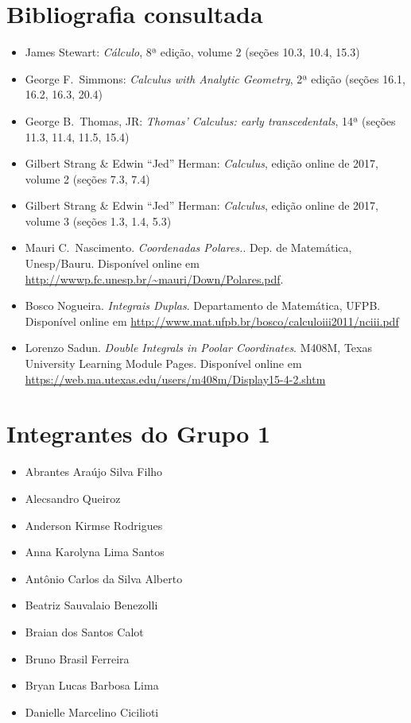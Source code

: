 \section{Bibliografia consultada}
\label{sec:biblio}

\begin{itemize}
  \item James Stewart: \emph{Cálculo}, 8ª edição, volume 2 (seções
    10.3, 10.4, 15.3)
  \item George F.\ Simmons: \emph{Calculus with Analytic Geometry},
    2ª edição (seções 16.1, 16.2, 16.3, 20.4)
  \item George B.\ Thomas, JR: \emph{Thomas' Calculus: early
    transcedentals}, 14ª (seções 11.3, 11.4, 11.5, 15.4)
  \item Gilbert Strang \& Edwin ``Jed'' Herman: \emph{Calculus},
    edição online de 2017, volume 2 (seções 7.3, 7.4)
  \item Gilbert Strang \& Edwin ``Jed'' Herman: \emph{Calculus},
    edição online de 2017, volume 3 (seções 1.3, 1.4, 5.3)
  \item Mauri C.\ Nascimento. \emph{Coordenadas Polares.}. Dep. de Matemática, Unesp/Bauru.
    Disponível online em \url{http://wwwp.fc.unesp.br/~mauri/Down/Polares.pdf}.
  \item Bosco Nogueira. \emph{Integrais Duplas}. Departamento de Matemática, UFPB.
    Disponível online em \url{http://www.mat.ufpb.br/bosco/calculoiii2011/nciii.pdf}
  \item Lorenzo Sadun. \emph{Double Integrals in Poolar Coordinates}. M408M, Texas University Learning Module Pages.
    Disponível online em \url{https://web.ma.utexas.edu/users/m408m/Display15-4-2.shtm}
\end{itemize}


\section{Integrantes do Grupo 1}
\label{sec:grupo}

\begin{itemize}
  \item Abrantes Araújo Silva Filho
  \item Alecsandro Queiroz
  \item Anderson Kirmse Rodrigues
  \item Anna Karolyna Lima Santos
  \item Antônio Carlos da Silva Alberto
  \item Beatriz Sauvalaio Benezolli
  \item Braian dos Santos Calot
  \item Bruno Brasil Ferreira
  \item Bryan Lucas Barbosa Lima
  \item Danielle Marcelino Cicilioti
\end{itemize}


